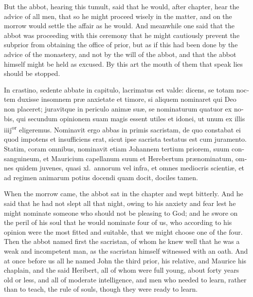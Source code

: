 \documentclass{book}
\begin{document}
\begin{paracol}{2}
\switchcolumn

But the abbot, hearing this tumult, said that he would, after chapter, hear the advice of all men, that so he might proceed wisely in the matter, and on the morrow would settle the affair as he would. And meanwhile one said that the abbot was proceeding with this ceremony that he might cautiously prevent the subprior from obtaining the office of prior, but as if this had been done by the advice of the monastery, and not by the will of the abbot, and that the abbot himself might be held as excused. By this art the mouth of them that speak lies should be stopped.

\switchcolumn*

\begin{otherlanguage}{latin}
In crastino, sedente abbate in capitulo, lacrimatus est valde: dicens, se totam noctem duxisse insomnem pr\ae{} anxietate et timore, si aliquem nominaret qui Deo non placeret; juravitque in periculo anim\ae{} su\ae{}, se nominaturum quatuor ex nobis, qui secundum opinionem suam magis essent utiles et idonei, ut unum ex illis iiij\textsuperscript{or} eligeremus. Nominavit ergo abbas in primis sacristam, de quo constabat ei quod impotens et insufficiens erat, sicut ipse sacrista testatus est cum juramento. Statim, coram omnibus, nominavit etiam Johannem tertium priorem, suum consanguineum, et Mauricium capellanum suum et Herebertum pr\ae{}nominatum, omnes quidem juvenes, quasi xl.\ annorum vel infra, et omnes mediocris scienti\ae{}, et ad regimen animarum potius docendi quam docit, dociles tamen.
\end{otherlanguage}

\switchcolumn

When the morrow came, the abbot sat in the chapter and wept bitterly. And he said that he had not slept all that night, owing to his anxiety and fear lest he might nominate someone who should not be pleasing to God; and he swore on the peril of his soul that he would nominate four of us, who according to his opinion were the most fitted and suitable, that we might choose one of the four. Then the abbot named first the sacristan, of whom he knew well that he was a weak and incompetent man, as the sacristan himself witnessed with an oath. And at once before us all he named John the third prior, his relative, and Maurice his chaplain, and the said Heribert, all of whom were full young, about forty years old or less, and all of moderate intelligence, and men who needed to learn, rather than to teach, the rule of souls, though they were ready to learn.


\end{paracol}
\end{document}
